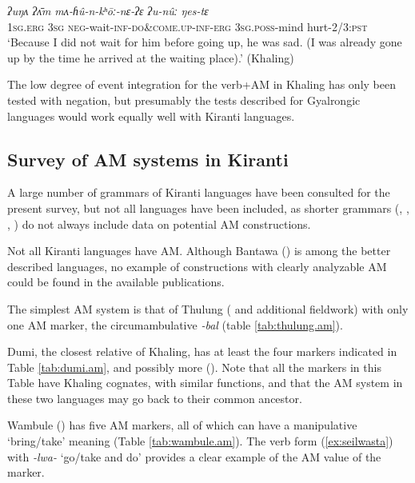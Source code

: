 \documentclass[oneside,a4paper,11pt]{article}
\newcommand{\ipa}[1]{{\phon\textit{#1}}}
\newcommand{\rouge}[1]{{\color{red}#1}}
\begin{document}
\begin{exe}
\ex \label{ex:mahunkhonya}
 \gll
\ipa{ʔuŋʌ} \ipa{ʔʌ̄m} \ipa{mʌ-ɦû-n-\rouge{kʰōː}-nɛ-ʔɛ} \ipa{ʔu-nûː} \ipa{ŋes-tɛ} \\
\textsc{1sg}.\textsc{erg} \textsc{3sg} \textsc{neg}-wait-\textsc{inf}-\rouge{\textsc{do\&come.up}}-\textsc{inf}-\textsc{erg} \textsc{3sg}.\textsc{poss}-mind hurt-2/3:\textsc{pst} \\
\glt `Because I did not wait for him before going up, he was sad. (I was already gone up by the time he arrived at the waiting place).'  (Khaling)
\end{exe}

 

The low degree of event integration for the verb+AM in Khaling has only been tested with negation, but presumably the tests described for Gyalrongic languages would work equally well with Kiranti languages.

\subsection{Survey of AM systems in Kiranti}

A large number of grammars of Kiranti languages have been consulted for the present survey, but not all languages have been included, as shorter grammars  (\citealt{ebert97athpare}, \citealt{ebert97camling}, \citealt{opgenort05jero}, \citealt{tolsma06kulung}) do not always include data on potential AM constructions. 

Not all Kiranti languages have AM. Although Bantawa (\citealt{doornenbal09}) is among the better described languages, no example of constructions with clearly analyzable AM could be found in the available publications.

The simplest AM system is that of Thulung (\citealt{lahaussois02thulung} and additional fieldwork) with only one AM marker, the circumambulative \ipa{-bal} (table \ref{tab:thulung.am}).

Dumi, the closest relative of Khaling, has at least the four markers indicated in Table \ref{tab:dumi.am}, and possibly more (\citealt[199-214]{driem93dumi}). Note that all the markers in this Table have Khaling cognates, with similar functions, and that the AM system in these two languages may go back to their common ancestor.

Wambule (\citealt{opgenort04wambule}) has five AM markers, all of which can have a manipulative `bring/take' meaning (Table   \ref{tab:wambule.am}). The verb form (\ref{ex:seilwasta}) with  \ipa{-lwa-} `go/take and do' provides a clear example of the AM value of the marker.
 
\end{document}
